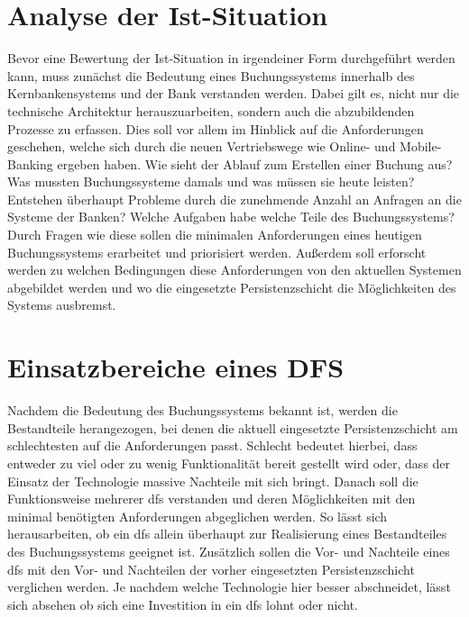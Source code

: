 \documentclass[12pt,oneside,a4paper,parskip]{scrbook}
\begin{document}
\section{Analyse der Ist-Situation}
Bevor eine Bewertung der Ist-Situation in irgendeiner Form durchgeführt werden kann, muss zunächst die Bedeutung eines Buchungssystems innerhalb des Kernbankensystems und der Bank verstanden werden. Dabei gilt es, nicht nur die technische Architektur herauszuarbeiten, sondern auch die abzubildenden Prozesse zu erfassen. Dies soll vor allem im Hinblick auf die Anforderungen geschehen, welche sich durch die neuen Vertriebswege wie Online- und Mobile-Banking ergeben haben. Wie sieht der Ablauf zum Erstellen einer Buchung aus? Was mussten Buchungssysteme damals und was müssen sie heute leisten? Entstehen überhaupt Probleme durch die zunehmende Anzahl an Anfragen an die Systeme der Banken? Welche Aufgaben habe welche Teile des Buchungssystems? Durch Fragen wie diese sollen die minimalen Anforderungen eines heutigen Buchungssystems erarbeitet und priorisiert werden. Außerdem soll erforscht werden zu welchen Bedingungen diese Anforderungen von den aktuellen Systemen abgebildet werden und wo die eingesetzte Persistenzschicht die Möglichkeiten des Systems ausbremst.

\section{Einsatzbereiche eines DFS}
Nachdem die Bedeutung des Buchungssystems bekannt ist, werden die Bestandteile herangezogen, bei denen die aktuell eingesetzte Persistenzschicht am schlechtesten auf die Anforderungen passt. Schlecht bedeutet hierbei, dass entweder zu viel oder zu wenig Funktionalität bereit gestellt wird oder, dass der Einsatz der Technologie massive Nachteile mit sich bringt. Danach soll die Funktionsweise mehrerer \ac{dfs} verstanden und deren Möglichkeiten mit den minimal benötigten Anforderungen abgeglichen werden. So lässt sich herausarbeiten, ob ein \ac{dfs} allein überhaupt zur Realisierung eines Bestandteiles des Buchungssystems geeignet ist. Zusätzlich sollen die Vor- und Nachteile eines \ac{dfs} mit den Vor- und Nachteilen der vorher eingesetzten Persistenzschicht verglichen werden. Je nachdem welche Technologie hier besser abschneidet, lässt sich absehen ob sich eine Investition in ein \ac{dfs} lohnt oder nicht.
\end{document}
